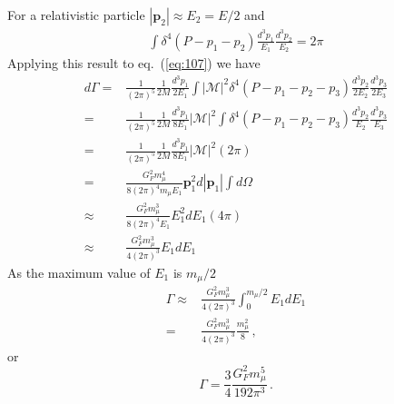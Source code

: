 For a relativistic particle $|\mathbf{p}_2|\approx E_2=E/2$ and
\begin{align}
  \int \delta^4(P-p_1-p_2)\frac{d^3 p_1}{E_1}\frac{d^3 p_2}{E_2}=2\pi
\end{align}
Applying this result to eq.~(\ref{eq:107}) we have
\begin{align}
    d\Gamma =& \frac{1}{(2\pi)^5}\frac{1}{2M}\frac{d^3 p_1}{2E_1}\int\left|\mathcal{M}\right|^2 \delta^4(P-p_1-p_2-p_3)
\frac{d^3 p_2}{2E_2}\frac{d^3 p_3}{2E_3}\nonumber\\
=&\frac{1}{(2\pi)^5}\frac{1}{2M}\frac{d^3 p_1}{8E_1}\left|\mathcal{M}\right|^2\int \delta^4(P-p_1-p_2-p_3)
\frac{d^3 p_2}{E_2}\frac{d^3 p_3}{E_3}\nonumber\\
=&\frac{1}{(2\pi)^5}\frac{1}{2M}\frac{d^3 p_1}{8E_1}\left|\mathcal{M}\right|^2(2\pi)\nonumber\\
  =&\frac{G_F^2m_\mu^4}{8(2\pi)^4 m_\mu E_1} \mathbf{p}_1^2 d|\mathbf{p}_1|\int d\Omega\nonumber\\
  \approx&\frac{G_F^2m_\mu^3}{8(2\pi)^4  E_1} E_1^2 d E_1(4\pi)\nonumber\\
  \approx&\frac{G_F^2m_\mu^3}{4(2\pi)^3} E_1 d E_1
\end{align}
As the maximum value  of $E_1$ is $m_\mu/2$
\begin{align}
  \Gamma\approx&\frac{G_F^2m_\mu^3}{4(2\pi)^3} \int_0^{m_\mu/2}E_1 d E_1\nonumber\\
   =&\frac{G_F^2m_\mu^3}{4(2\pi)^3} \frac{m_\mu^2}{8}\,,
\end{align}
or
\begin{equation}
  \Gamma=\frac{3}{4}\frac{G_F^2m_\mu^5}{192\pi^3}\,.
\end{equation}

